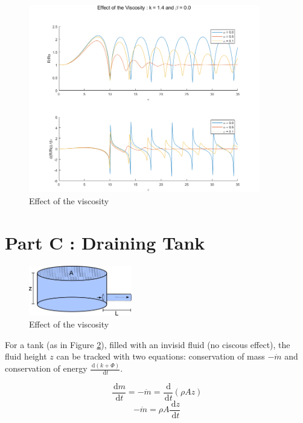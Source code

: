 \documentclass{article}
\newcommand{\ud}{\,\mathrm{d}}
\begin{document}
\begin{figure}[h!]
	\centering
	\includegraphics[width=0.90\textwidth]{./matlab/growingBubbles_Viscosity.png}
	\caption{Effect of the viscosity}
	\label{img:growingBubblesViscosity}
\end{figure}


\section{Part C : Draining Tank}

\begin{figure}[h!]
	\centering
	\includegraphics[width=0.40\textwidth]{./img/drainingTank.png}
	\caption{Effect of the viscosity}
	\label{img:drainingTank}
\end{figure}

For a tank (as in Figure \ref{img:drainingTank}), filled with an invisid fluid (no ciscous effect), the fluid height $z$ can be tracked with two equations: conservation of mass $\displaystyle - \dot{m}$ and conservation of energy $\displaystyle \frac{\ud (k + \Phi)}{\ud t}$.

$$ \frac{\ud m}{\ud t} = - \dot{m} = \frac{\ud}{\ud t} \left( \rho A z \right) $$
$$ - \dot{m} = \rho A \frac{\ud z}{\ud t} $$
\end{document}
